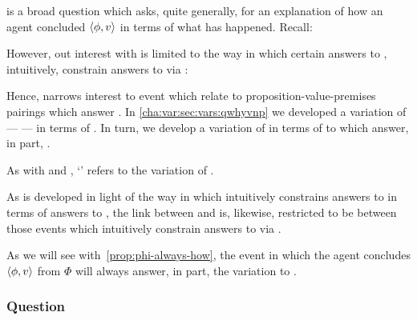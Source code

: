 \begin{note}
  \qHow{} is a broad question which asks, quite generally, for an explanation of how an agent concluded \(\langle \phi, v \rangle\) in terms of what has happened.
  Recall:

  \begin{quote}%
    \vspace{-1.5\baselineskip}%
    \questionHowBasic*
  \end{quote}

  However, out interest with \qHow{} is limited to the way in which certain answers to \qHow{}, intuitively, constrain answers to \qWhy{} via \issueInclusion{}:

  \begin{quote}%
    \vspace{-1.5\baselineskip}%
    \issueInclusionFirst*
  \end{quote}

  Hence, \issueInclusion{} narrows interest to event which relate to proposition-value-premises pairings which answer \qWhy{}.
  In \autoref{cha:var:sec:vars:qwhyvnp} we developed a variation of \qWhy{} --- \qWhyV{} --- in terms of \ros{}.
  In turn, we develop a variation of \qHow{} in terms of  to \ros{} which answer, in part, \qWhyV{}.

  As with \qWhy{} and \qWhyV{}, `\qHowV{}' refers to the variation of \qHow{}.
\end{note}

\begin{note}
  As \qHowV{} is developed in light of the way in which \issueInclusion{} intuitively constrains answers to \qWhy{} in terms of answers to \qHow{}, the link between \qHowV{} and \qHow{} is, likewise, restricted to be between those events which intuitively constrain answers to \qWhy{} via \issueInclusion{}.
\end{note}

\begin{note}
  As we will see with~\autoref{prop:phi-always-how}, the event in which the agent concludes \(\langle \phi, v \rangle\) from \(\Phi\) will always answer, in part, the variation to \qHow{}.
\end{note}

\subsubsection{Question}
\label{cha:var:sec:vars:qhowv:sec:question}

